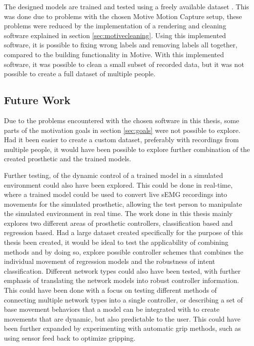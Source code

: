 \documentclass[../main.tex]{subfiles}
\begin{document}
The designed models are trained and tested using a freely available dataset \cite{kinmusdataset}.
This was done due to problems with the chosen Motive Motion Capture setup, these problems were reduced by the implementation of a rendering and cleaning software explained in section \ref{sec:motivecleaning}.
Using this implemented software, it is possible to fixing wrong labels and removing labels all together, compared to the building functionality in Motive.
With this implemented software, it was possible to clean a small subset of recorded data, but it was not possible to create a full dataset of multiple people.





\newpage
\subsection{Future Work}

Due to the problems encountered with the chosen software in this thesis, some parts of the motivation goals in section \ref{sec:goals} were not possible to explore.
Had it been easier to create a custom dataset, preferably with recordings from multiple people, it would have been possible to explore further combination of the created prosthetic and the trained models.

Further testing, of the dynamic control of a trained model in a simulated environment could also have been explored.
This could be done in real-time, where a trained model could be used to convert live sEMG recordings into movements for the simulated prosthetic, allowing the test person to manipulate the simulated environment in real time.
The work done in this thesis mainly explores two different areas of prosthetic controllers, classification based and regression based.
Had a large dataset created specifically for the purpose of this thesis been created, it would be ideal to test the applicability of combining methods and by doing so, explore possible controller schemes that combines the individual movement of regression models and the robustness of intent classification.  
Different network types could also have been tested, with further emphasis of translating the network models into robust controller information.
This could have been done with a focus on testing different methods of connecting multiple network types into a single controller, or describing a set of base movement behaviors that a model can be integrated with to create movements that are dynamic, but also predictable to the user.  
This could have been further expanded by experimenting with automatic grip methods, such as using sensor feed back to optimize gripping. 
\end{document}
